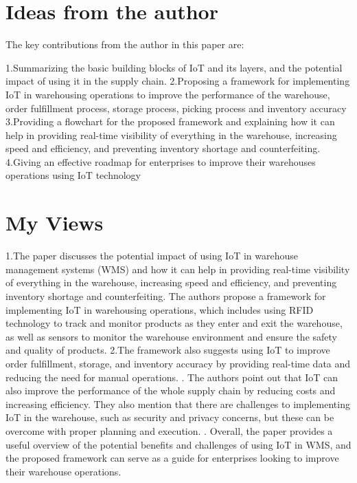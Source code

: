 \documentclass[12pt,letterpaper]{article}
\begin{document}
\section{Ideas from the author}

\newline 
The key contributions from the author in this paper are:

1.Summarizing the basic building blocks of IoT and its layers, and the potential impact of using it in the supply chain.\newline
2.Proposing a framework for implementing IoT in warehousing operations to improve the performance of the warehouse, order fulfillment process, storage process, picking process and inventory accuracy \newline
3.Providing a flowchart for the proposed framework and explaining how it can help in providing real-time visibility of everything in the warehouse, increasing speed and efficiency, and preventing inventory shortage and counterfeiting. \newline
4.Giving an effective roadmap for enterprises to improve their warehouses operations using IoT technology \newline



 \section{My Views \newline} \newline
    1.The paper discusses the potential impact of using IoT in warehouse management systems (WMS) and how it can help in providing real-time visibility of everything in the warehouse, increasing speed and efficiency, and preventing inventory shortage and counterfeiting. The authors propose a framework for implementing IoT in warehousing operations, which includes using RFID technology to track and monitor products as they enter and exit the warehouse, as well as sensors to monitor the warehouse environment and ensure the safety and quality of products.\newline
    2.The framework also suggests using IoT to improve order fulfillment, storage, and inventory accuracy by providing real-time data and reducing the need for manual operations. . The authors point out that IoT can also improve the performance of the whole supply chain by reducing costs and increasing efficiency. They also mention that there are challenges to implementing IoT in the warehouse, such as security and privacy concerns, but these can be overcome with proper planning and execution. . Overall, the paper provides a useful overview of the potential benefits and challenges of using IoT in WMS, and the proposed framework can serve as a guide for enterprises looking to improve their warehouse operations. \newline
\end{document}
